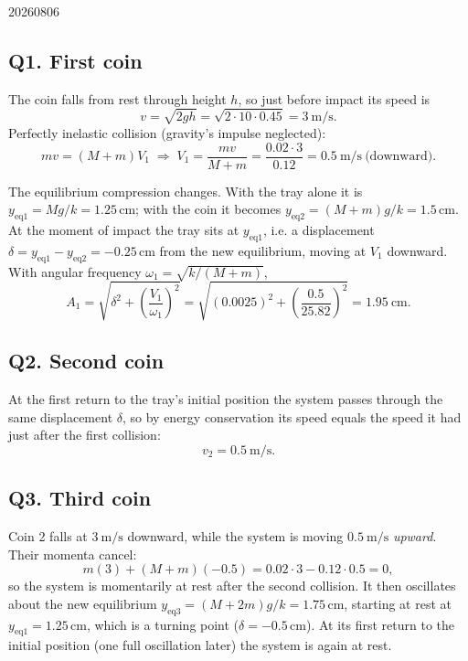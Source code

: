 \begin{solution}{20260806}

\subsection*{Q1. First coin}

The coin falls from rest through height $h$, so just before impact its speed is
\[
  v = \sqrt{2gh} = \sqrt{2\cdot 10\cdot 0.45} = 3\ \mathrm{m/s}.
\]
Perfectly inelastic collision (gravity's impulse neglected):
\[
  m v = (M+m) V_{1}
  \;\Longrightarrow\;
  V_{1} = \frac{m v}{M+m} = \frac{0.02\cdot 3}{0.12}
        = \boxed{0.5\ \mathrm{m/s}\ \text{(downward)}}.
\]

The equilibrium compression changes.  With the tray alone it is $y_{\text{eq}1} = Mg/k = 1.25\,\mathrm{cm}$; with the coin it becomes $y_{\text{eq}2} = (M+m)g/k = 1.5\,\mathrm{cm}$.  At the moment of impact the tray sits at $y_{\text{eq}1}$, i.e. a displacement $\delta = y_{\text{eq}1}-y_{\text{eq}2} = -0.25\,\mathrm{cm}$ from the new equilibrium, moving at $V_{1}$ downward.  With angular frequency $\omega_{1} = \sqrt{k/(M+m)}$,
\[
  A_{1} = \sqrt{\delta^{2} + \left(\frac{V_{1}}{\omega_{1}}\right)^{2}}
        = \sqrt{(0.0025)^{2} + \left(\frac{0.5}{25.82}\right)^{2}}
        = \boxed{1.95\ \mathrm{cm}}.
\]

\subsection*{Q2. Second coin}

At the first return to the tray's initial position the system passes through the same displacement $\delta$, so by energy conservation its speed equals the speed it had just after the first collision:
\[
  \boxed{v_{2} = 0.5\ \mathrm{m/s}}.
\]

\subsection*{Q3. Third coin}

Coin 2 falls at $3\ \mathrm{m/s}$ downward, while the system is moving $0.5\ \mathrm{m/s}$ \emph{upward}.  Their momenta cancel:
\[
  m(3) + (M+m)(-0.5) = 0.02\cdot 3 - 0.12\cdot 0.5 = 0,
\]
so the system is momentarily at rest after the second collision.  It then oscillates about the new equilibrium $y_{\text{eq}3} = (M+2m)g/k = 1.75\,\mathrm{cm}$, starting at rest at $y_{\text{eq}1} = 1.25\,\mathrm{cm}$, which is a turning point ($\delta = -0.5\,\mathrm{cm}$).  At its first return to the initial position (one full oscillation later) the system is again at rest.


\end{solution}
